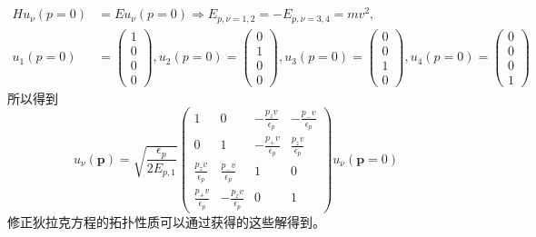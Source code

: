 \documentclass{article}
\numberwithin{equation}{subsection}
\begin{document}
\begin{equation}
    \begin{split}
        Hu_{\nu}(p=0)&=Eu_{\nu}(p=0)\Rightarrow E_{p,\nu=1,2}=-E_{p,\nu=3,4}=mv^2,\\
        u_{1}(p=0)&=\begin{pmatrix}
            1\\0\\0\\0
        \end{pmatrix},u_2(p=0)=\begin{pmatrix}
            0\\1\\0\\0
        \end{pmatrix},u_3(p=0)=\begin{pmatrix}
            0\\0\\1\\0
        \end{pmatrix},u_4(p=0)=\begin{pmatrix}
            0\\0\\0\\1
        \end{pmatrix}
    \end{split}
\end{equation}
所以得到
\begin{equation}
    u_{\nu}(\mathbf{p})=\sqrt{\frac{\epsilon_p}{2E_{p,1}}}\begin{pmatrix}
        1&0&-\frac{p_zv}{\epsilon_p}&-\frac{p_-v}{\epsilon_p}\\
        0&1&-\frac{p_+v}{\epsilon_p}&\frac{p_zv}{\epsilon_p}\\
        \frac{p_zv}{\epsilon_p}&\frac{p_-v}{\epsilon_p}&1&0\\
        \frac{p_+v}{\epsilon_p}&-\frac{p_zv}{\epsilon_p}&0&1
    \end{pmatrix}u_\nu(\mathbf{p}=0)
\end{equation}
修正狄拉克方程的拓扑性质可以通过获得的这些解得到。
\end{document}
